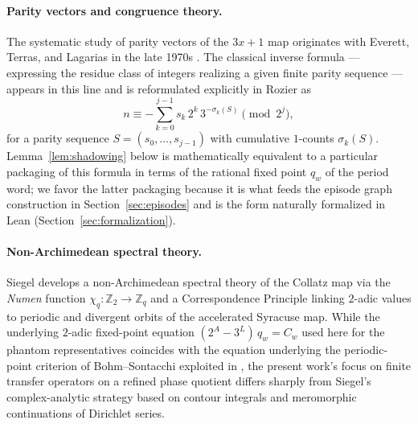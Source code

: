 \documentclass[11pt,a4paper]{article}
\theoremstyle{definition}
\newcommand{\Z}{\mathbb{Z}}
\newcommand{\Zp}{\mathbb{Z}_2}
\begin{document}
\paragraph{Parity vectors and congruence theory.}
The systematic study of parity vectors of the $3x+1$ map originates
with Everett, Terras, and Lagarias in the late 1970s
\cite{lagarias1985}. The classical inverse formula --- expressing
the residue class of integers realizing a given finite parity
sequence --- appears in this line and is reformulated explicitly
in Rozier \cite[Lemma 1]{rozier2025} as
\[
n \equiv -\sum_{k=0}^{j-1} s_k\, 2^k\, 3^{-\sigma_k(S)}
\pmod{2^j},
\]
for a parity sequence $S = (s_0, \dots, s_{j-1})$ with cumulative
$1$-counts $\sigma_k(S)$. Lemma~\ref{lem:shadowing} below is
mathematically equivalent to a particular packaging of this formula
in terms of the rational fixed point $q_w$ of the period word; we
favor the latter packaging because it is what feeds the episode
graph construction in Section~\ref{sec:episodes} and is the form
naturally formalized in Lean (Section~\ref{sec:formalization}).

\paragraph{Non-Archimedean spectral theory.}
Siegel \cite{siegel2023a,siegel2023b,siegel2026hydra} develops a
non-Archimedean spectral theory of the Collatz map via the
\emph{Numen} function $\chi_q\colon \Zp \to \Z_q$ and a
Correspondence Principle linking $2$-adic values to periodic and
divergent orbits of the accelerated Syracuse map. While the
underlying $2$-adic fixed-point equation
$(2^A - 3^L)\, q_w = C_w$ used here for the phantom representatives
coincides with the equation underlying the periodic-point criterion
of Bohm--Sontacchi exploited in \cite{siegel2023a}, the present
work's focus on finite transfer operators on a refined phase
quotient differs sharply from Siegel's complex-analytic strategy
based on contour integrals and meromorphic continuations of
Dirichlet series.
\end{document}
